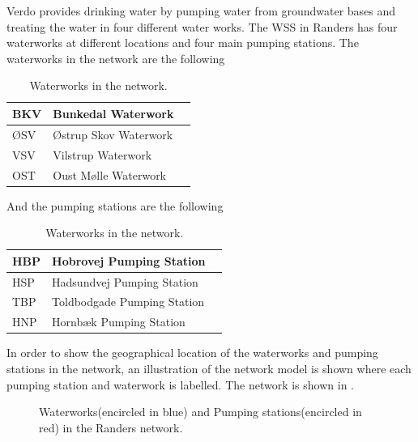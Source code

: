 Verdo provides drinking water by pumping water from groundwater bases and treating the water in four different water works. The WSS in Randers has four waterworks at different locations and four main pumping stations. The waterworks in the network are the following

\begin{table}[H]
\begin{center}
    \begin{tabular}{| l | l | l |}
    \hline
    BKV & Bunkedal Waterwork   \\ \hline
    ØSV & Østrup Skov Waterwork  \\ \hline
    VSV & Vilstrup Waterwork  \\ \hline
    OST & Oust Mølle Waterwork   \\
    \hline
    \end{tabular}
\end{center}
\caption{Waterworks in the network.}
\end{table}

And the pumping stations are the following

\begin{table}[H]
\begin{center}
    \begin{tabular}{| l | l | l |}
    \hline
    HBP & Hobrovej Pumping Station   \\ \hline
    HSP & Hadsundvej Pumping Station  \\ \hline
    TBP & Toldbodgade Pumping Station  \\ \hline
    HNP & Hornbæk Pumping Station   \\
    \hline
    \end{tabular}
\end{center}
\caption{Waterworks in the network.}
\end{table}

In order to show the geographical location of the waterworks and pumping stations in the network, an illustration of the network model is shown where each pumping station and waterwork is labelled. The network is shown in .

\begin{figure}[H]
\centering
 
\caption{Waterworks(encircled in blue) and Pumping stations(encircled in red) in the Randers network.}
\label{fig:pumping_stations_and_waterworks}
\end{figure}


